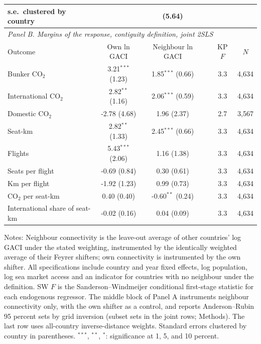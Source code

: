 \documentclass[12pt]{extarticle}
\begin{document}
\begin{table}[H]
{\begin{threeparttable}
\begin{tabular}{lccccc}
  \quad s.e.\ clustered by country & & (5.64) & & & \\
\midrule
\multicolumn{6}{l}{\textit{Panel B. Margins of the response, contiguity definition, joint 2SLS}} \\
Outcome & Own ln GACI & Neighbour ln GACI & & KP $F$ & $N$ \\
\midrule
  Bunker CO$_2$ & 3.21$^{***}$ (1.23) & 1.85$^{***}$ (0.66) & & 3.3 & 4,634 \\
  International CO$_2$ & 2.82$^{**}$ (1.16) & 2.06$^{***}$ (0.59) & & 3.3 & 4,634 \\
  Domestic CO$_2$ & -2.78 (4.68) & 1.96 (2.37) & & 2.7 & 3,567 \\
  Seat-km & 2.82$^{**}$ (1.33) & 2.45$^{***}$ (0.66) & & 3.3 & 4,634 \\
  Flights & 5.43$^{***}$ (2.06) & 1.16 (1.38) & & 3.3 & 4,634 \\
  Seats per flight & -0.69 (0.84) & 0.30 (0.61) & & 3.3 & 4,634 \\
  Km per flight & -1.92 (1.23) & 0.99 (0.73) & & 3.3 & 4,634 \\
  CO$_2$ per seat-km & 0.40 (0.40) & -0.60$^{**}$ (0.24) & & 3.3 & 4,634 \\
  International share of seat-km & -0.02 (0.16) & 0.04 (0.09) & & 3.3 & 4,634 \\
\bottomrule
\end{tabular}
\begin{tablenotes}[flushleft]
\footnotesize
\item Notes: Neighbour connectivity is the leave-out average of other countries' log GACI under the stated weighting, instrumented by the identically weighted average of their Feyrer shifters; own connectivity is instrumented by the own shifter. All specifications include country and year fixed effects, log population, log sea market access and an indicator for countries with no neighbour under the definition. SW $F$ is the Sanderson--Windmeijer conditional first-stage statistic for each endogenous regressor. The middle block of Panel A instruments neighbour connectivity only, with the own shifter as a control, and reports Anderson--Rubin 95 percent sets by grid inversion (subset sets in the joint rows; Methods). The last row uses all-country inverse-distance weights. Standard errors clustered by country in parentheses. $^{***}$, $^{**}$, $^{*}$: significance at 1, 5, and 10 percent.
\end{tablenotes}
\end{threeparttable}}
\end{table}
\end{document}
